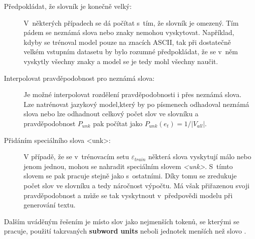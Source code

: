 \begin{description}
  \item[Předpokládat, že slovník je konečně velký:] V~některých případech se dá počítat s~tím, že slovník je omezený. Tím pádem se neznámá slova nebo znaky nemohou vyskytovat. Například, kdyby se trénoval model pouze na znacích ASCII, tak při dostatečně velkém vstupním datasetu by bylo rozumné předpokládat, že se v~něm vyskytly všechny znaky a model se je tedy mohl všechny naučit.
  \item[Interpolovat pravděpodobnost pro neznámá slova:] Je možné interpolovat rozdělení pravděpodobnosti i přes neznámá slova. Lze natrénovat jazykový model,který by po písmenech odhadoval neznámá slova nebo lze odhadnout celkový počet slov ve slovníku a pravděpodobnost $P_{unk}$ pak počítat jako $P_{unk}(e_t) = 1/|V_{all}|$.
  \item[Přidáním speciálního slova <unk>:]\label{description:unk}V případě, že se v~trénovacím setu $\varepsilon_{train}$ některá slova vyskytují málo nebo jenom jednou, mohou se nahradit speciálním slovem \emph{<unk>}. S~tímto slovem se pak pracuje stejně jako s~ostatními. Díky tomu se zredukuje počet slov ve slovníku a tedy náročnost výpočtu. Má však přiřazenou svoji pravděpodobnost a může se tak vyskytnout v~předpovědi modelu při generování textu.
\end{description}

Dalším uváděným řešením je místo slov jako nejmenších tokenů, se kterými se pracuje, použití takzvaných \textbf{subword units} neboli jednotek menších než slovo \cite{subwords}.


